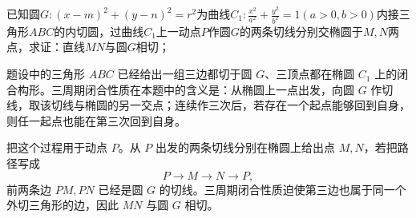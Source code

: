 \begin{exercise}[一般三相切]
    已知圆$G:(x-m)^2+(y-n)^2=r^2$为曲线$C_1:\frac{x^2}{a^2}+\frac{y^2}{b^2}=1(a>0,b>0)$内接三角形$ABC$的内切圆，过曲线$C_1$上一动点$P$作圆$G$的两条切线分别交椭圆于$M,N$两点，求证：直线$MN$与圆$G$相切；
\end{exercise}
\begin{solution}
题设中的三角形 $ABC$ 已经给出一组三边都切于圆 $G$、三顶点都在椭圆 $C_1$ 上的闭合构形。三周期闭合性质在本题中的含义是：从椭圆上一点出发，向圆 $G$ 作切线，取该切线与椭圆的另一交点；连续作三次后，若存在一个起点能够回到自身，则任一起点也能在第三次回到自身。

把这个过程用于动点 $P$。从 $P$ 出发的两条切线分别在椭圆上给出点 $M,N$，若把路径写成
\[
P\longrightarrow M\longrightarrow N\longrightarrow P,
\]
前两条边 $PM,PN$ 已经是圆 $G$ 的切线。三周期闭合性质迫使第三边也属于同一个外切三角形的边，因此 $MN$ 与圆 $G$ 相切。
\end{solution}

